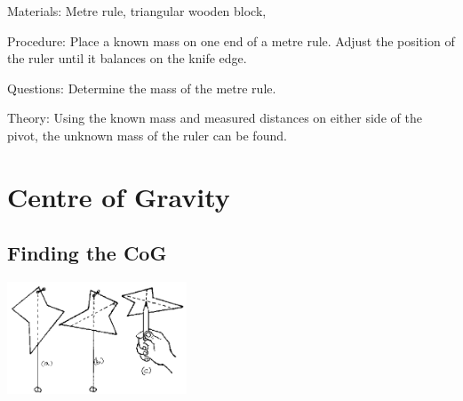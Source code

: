 \begin{multicols}{2}
\begin{description*}
\item[Materials:]{Metre rule, triangular wooden block, }
\item[Procedure:]{Place a known mass on one end of a metre rule. Adjust the position of the ruler until it balances on the knife edge.}
\item[Questions:]{Determine the mass of the metre rule.}
\item[Theory:]{Using the known mass and measured distances on either side of the pivot, the unknown mass of the ruler can be found.}
\end{description*}


\section*{Centre of Gravity}


\subsection{Finding the CoG}

\begin{center}
\includegraphics[width=0.4\textwidth]{./img/source/cog.png}
\end{center}


\end{multicols}
